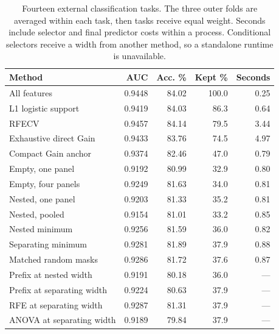 \begin{table}[tb]
\centering
\caption{Fourteen external classification tasks. The three outer folds are averaged within each task, then tasks receive equal weight. Seconds include selector and final predictor costs within a process. Conditional selectors receive a width from another method, so a standalone runtime is unavailable.}
\label{tab:external}
\small
\begin{tabular}{@{}lrrrr@{}}
\toprule
Method & AUC & Acc. \% & Kept \% & Seconds \\
\midrule
All features & 0.9448 & 84.02 & 100.0 & 0.25 \\
L1 logistic support & 0.9419 & 84.03 & 86.3 & 0.64 \\
RFECV & 0.9457 & 84.14 & 79.5 & 3.44 \\
Exhaustive direct Gain & 0.9433 & 83.76 & 74.5 & 4.97 \\
Compact Gain anchor & 0.9374 & 82.46 & 47.0 & 0.79 \\
Empty, one panel & 0.9192 & 80.99 & 32.9 & 0.80 \\
Empty, four panels & 0.9249 & 81.63 & 34.0 & 0.81 \\
Nested, one panel & 0.9203 & 81.33 & 35.2 & 0.81 \\
Nested, pooled & 0.9154 & 81.01 & 33.2 & 0.85 \\
Nested minimum & 0.9256 & 81.59 & 36.0 & 0.82 \\
Separating minimum & 0.9281 & 81.89 & 37.9 & 0.88 \\
Matched random masks & 0.9286 & 81.72 & 37.6 & 0.87 \\
Prefix at nested width & 0.9191 & 80.18 & 36.0 & --- \\
Prefix at separating width & 0.9224 & 80.63 & 37.9 & --- \\
RFE at separating width & 0.9287 & 81.31 & 37.9 & --- \\
ANOVA at separating width & 0.9189 & 79.84 & 37.9 & --- \\
\bottomrule
\end{tabular}
\end{table}
